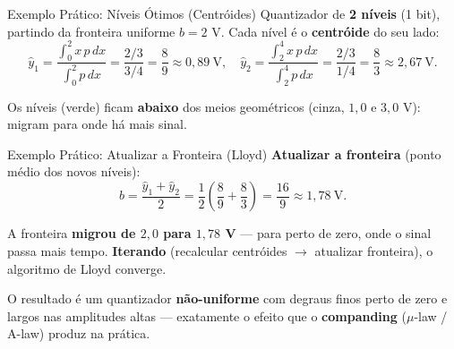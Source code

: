 \begin{frame}{Exemplo Prático: Níveis Ótimos (Centróides)}
  Quantizador de \textbf{2 níveis} (1 bit), partindo da fronteira uniforme
  $b = 2$ V. Cada nível é o \textbf{centróide} do seu lado:
  \[
    \hat{y}_1 = \frac{\displaystyle\int_0^2 x\,p\,dx}{\displaystyle\int_0^2 p\,dx}
              = \frac{2/3}{3/4} = \frac{8}{9} \approx 0{,}89\ \text{V},
    \quad
    \hat{y}_2 = \frac{\displaystyle\int_2^4 x\,p\,dx}{\displaystyle\int_2^4 p\,dx}
              = \frac{2/3}{1/4} = \frac{8}{3} \approx 2{,}67\ \text{V}.
  \]

  \vspace{0.05cm}
  \begin{center}
  \end{center}

  \vspace{-0.05cm}
  {\footnotesize Os níveis (verde) ficam \textbf{abaixo} dos meios
  geométricos (cinza, $1{,}0$ e $3{,}0$ V): migram para onde há mais sinal.}
\end{frame}


\begin{frame}{Exemplo Prático: Atualizar a Fronteira (Lloyd)}
  \textbf{Atualizar a fronteira} (ponto médio dos novos níveis):
  \[
    b = \frac{\hat{y}_1 + \hat{y}_2}{2}
      = \frac{1}{2}\!\left(\frac{8}{9} + \frac{8}{3}\right)
      = \frac{16}{9} \approx 1{,}78\ \text{V}.
  \]

  A fronteira \textbf{migrou de $2{,}0$ para $1{,}78$ V} — para perto de
  zero, onde o sinal passa mais tempo. \textbf{Iterando} (recalcular
  centróides $\to$ atualizar fronteira), o algoritmo de Lloyd converge.

  \vspace{0.2cm}
  \begin{block}{}
  O resultado é um quantizador \textbf{não-uniforme} com degraus finos
  perto de zero e largos nas amplitudes altas — exatamente o efeito que o
  \textbf{companding} ($\mu$-law / A-law) produz na prática.
  \end{block}
\end{frame}

